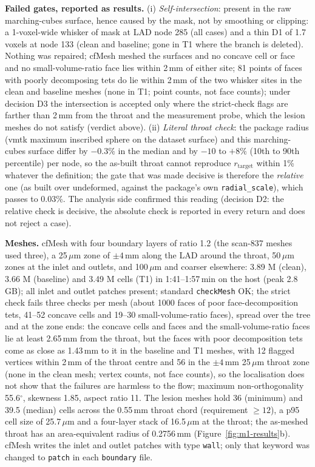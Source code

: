 \documentclass[11pt]{article}
\begin{document}
\textbf{Failed gates, reported as results.} (i) \emph{Self-intersection}: present in the raw marching-cubes surface, hence caused by the mask, not by smoothing or clipping: a 1-voxel-wide whisker of mask at LAD node 285 (all cases) and a thin D1 of 1.7 voxels at node 133 (clean and baseline; gone in T1 where the branch is deleted). Nothing was repaired; cfMesh meshed the surfaces and no concave cell or face and no small-volume-ratio face lies within 2\,mm of either site; 81 points of faces with poorly decomposing tets do lie within 2\,mm of the two whisker sites in the clean and baseline meshes (none in T1; point counts, not face counts); under decision D3 the intersection is accepted only where the strict-check flags are farther than 2\,mm from the throat and the measurement probe, which the lesion meshes do not satisfy (verdict above). (ii) \emph{Literal throat check}: the package radius (vmtk maximum inscribed sphere on the dataset surface) and this marching-cubes surface differ by $-0.3\%$ in the median and by $-10$ to $+8\%$ (10th to 90th percentile) per node, so the as-built throat cannot reproduce $r_\text{target}$ within 1\% whatever the definition; the gate that was made decisive is therefore the \emph{relative} one (as built over undeformed, against the package's own \texttt{radial\_scale}), which passes to 0.03\%. The analysis side confirmed this reading (decision D2: the relative check is decisive, the absolute check is reported in every return and does not reject a case).

\textbf{Meshes.} cfMesh with four boundary layers of ratio 1.2 (the scan-837 meshes used three), a 25\,$\mu$m zone of $\pm4$\,mm along the LAD around the throat, 50\,$\mu$m zones at the inlet and outlets, and 100\,$\mu$m and coarser elsewhere: 3.89 M (clean), 3.66 M (baseline) and 3.49 M cells (T1) in 1:41--1:57\,min on the host (peak 2.8\,GB); all inlet and outlet patches present; standard \texttt{checkMesh} OK; the strict check fails three checks per mesh (about 1000 faces of poor face-decomposition tets, 41--52 concave cells and 19--30 small-volume-ratio faces), spread over the tree and at the zone ends: the concave cells and faces and the small-volume-ratio faces lie at least 2.65\,mm from the throat, but the faces with poor decomposition tets come as close as 1.43\,mm to it in the baseline and T1 meshes, with 12 flagged vertices within 2\,mm of the throat centre and 56 in the $\pm4$\,mm 25\,$\mu$m throat zone (none in the clean mesh; vertex counts, not face counts), so the localisation does not show that the failures are harmless to the flow; maximum non-orthogonality 55.6$^\circ$, skewness 1.85, aspect ratio 11. The lesion meshes hold 36 (minimum) and 39.5 (median) cells across the 0.55\,mm throat chord (requirement $\geq12$), a p95 cell size of 25.7\,$\mu$m and a four-layer stack of 16.5\,$\mu$m at the throat; the as-meshed throat has an area-equivalent radius of 0.2756\,mm (Figure~\ref{fig:m1-results}b). cfMesh writes the inlet and outlet patches with type \texttt{wall}; only that keyword was changed to \texttt{patch} in each \texttt{boundary} file.
\end{document}
